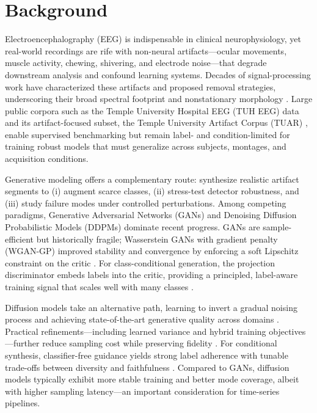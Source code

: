 \documentclass{article}
\begin{document}

\section{Background}

Electroencephalography (EEG) is indispensable in clinical neurophysiology, yet real-world recordings are rife with non-neural artifacts—ocular movements, muscle activity, chewing, shivering, and electrode noise—that degrade downstream analysis and confound learning systems. Decades of signal-processing work have characterized these artifacts and proposed removal strategies, underscoring their broad spectral footprint and nonstationary morphology \citep{uriguengarciazapirain2015}. Large public corpora such as the Temple University Hospital EEG (TUH EEG) data \citep{obeid2016temple} and its artifact-focused subset, the Temple University Artifact Corpus (TUAR) \citep{hamid2020tuar}, enable supervised benchmarking but remain label- and condition-limited for training robust models that must generalize across subjects, montages, and acquisition conditions.

Generative modeling offers a complementary route: synthesize realistic artifact segments to (i) augment scarce classes, (ii) stress-test detector robustness, and (iii) study failure modes under controlled perturbations. Among competing paradigms, Generative Adversarial Networks (GANs) and Denoising Diffusion Probabilistic Models (DDPMs) dominate recent progress. GANs are sample-efficient but historically fragile; Wasserstein GANs with gradient penalty (WGAN-GP) improved stability and convergence by enforcing a soft Lipschitz constraint on the critic \citep{gulrajani2017improved}. For class-conditional generation, the projection discriminator embeds labels into the critic, providing a principled, label-aware training signal that scales well with many classes \citep{miyato2018cgans}. 

Diffusion models take an alternative path, learning to invert a gradual noising process and achieving state-of-the-art generative quality across domains \citep{ho2020denoising}. Practical refinements—including learned variance and hybrid training objectives—further reduce sampling cost while preserving fidelity \citep{nichol2021improved}. For conditional synthesis, classifier-free guidance yields strong label adherence with tunable trade-offs between diversity and faithfulness \citep{ho2022classifierfree}. Compared to GANs, diffusion models typically exhibit more stable training and better mode coverage, albeit with higher sampling latency—an important consideration for time-series pipelines.
\end{document}
